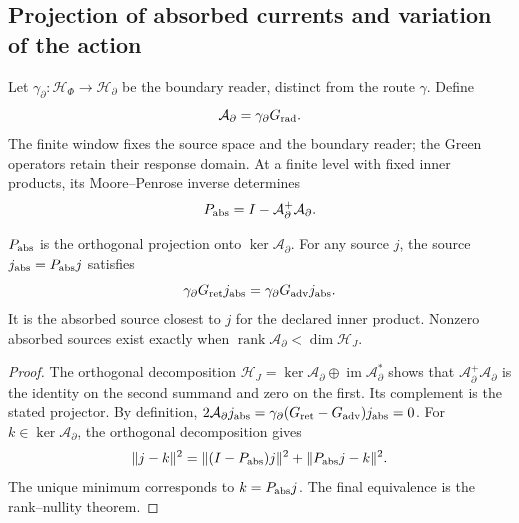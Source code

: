 \subsection{Projection of absorbed currents and variation of the action}
\label{vii:subsec:proyeccion-absorcion}

Let \(\gamma_\partial:\mathcal H_\Phi\to\mathcal H_\partial\)
be the boundary reader, distinct from the route \(\gamma\). Define
\[
 \mathcal A_\partial=\gamma_\partial G_{\rm rad}.
\]
The finite window fixes the source space and the boundary reader;
the Green operators retain their response domain. At a finite level with
fixed inner products, its Moore--Penrose
inverse determines
\begin{equation}
 P_{\rm abs}=I-\mathcal A_\partial^+\mathcal A_\partial.
 \label{vii:eq:proyector-absorcion}
\end{equation}

\begin{theorem}
\label{vii:thm:proyeccion-absorcion}
\(P_{\rm abs}\) is the orthogonal projection onto
\(\ker\mathcal A_\partial\). For any source \(j\), the source
\(j_{\rm abs}=P_{\rm abs}j\) satisfies
\begin{equation}
 \gamma_\partial G_{\rm ret}j_{\rm abs}
 =\gamma_\partial G_{\rm adv}j_{\rm abs}.
 \label{vii:eq:igualdad-borde-absorbido}
\end{equation}
It is the absorbed source closest to \(j\) for the declared
inner product. Nonzero absorbed sources exist exactly when
\(\operatorname{rank}\mathcal A_\partial<\dim\mathcal H_J\).
\end{theorem}
\begin{proof}
The orthogonal decomposition
\(\mathcal H_J=\ker\mathcal A_\partial\oplus
 \operatorname{im}\mathcal A_\partial^*\) shows that
\(\mathcal A_\partial^+\mathcal A_\partial\) is the identity
on the second summand and zero on the first. Its complement is the
stated projector. By definition,
\(2\mathcal A_\partial j_{\rm abs}
 =\gamma_\partial(G_{\rm ret}-G_{\rm adv})j_{\rm abs}=0\).
For \(k\in\ker\mathcal A_\partial\), the orthogonal decomposition gives
\[
 \|j-k\|^2=\|(I-P_{\rm abs})j\|^2+\|P_{\rm abs}j-k\|^2.
\]
The unique minimum corresponds to \(k=P_{\rm abs}j\).
The final equivalence is the rank--nullity theorem.
\end{proof}

